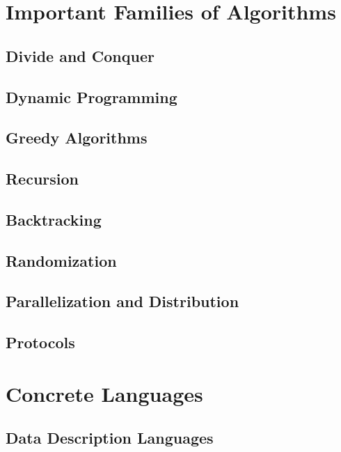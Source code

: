 \documentclass{book}
\begin{document}
\part{Important Families of Algorithms} %

\chapter{Divide and Conquer}
 
\chapter{Dynamic Programming}

\chapter{Greedy Algorithms}

\chapter{Recursion}

\chapter{Backtracking}

\chapter{Randomization}

\chapter{Parallelization and Distribution}

\chapter{Protocols}



\part{Concrete Languages}

\chapter{Data Description Languages}
 
\end{document}
